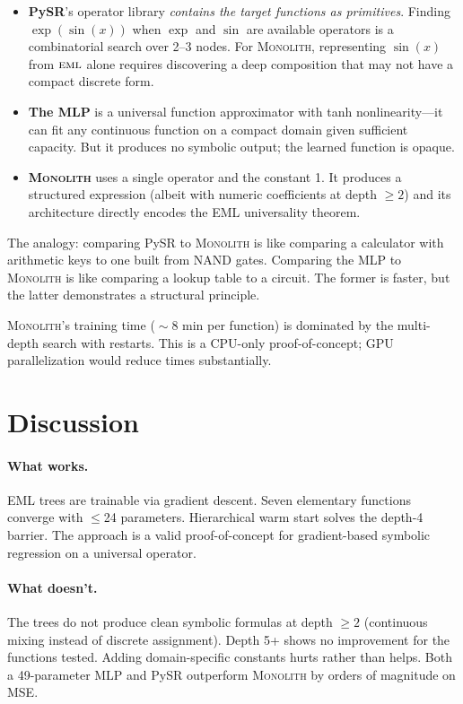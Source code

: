 \documentclass[11pt,a4paper]{article}
\newcommand{\eml}{\textsc{eml}}
\newcommand{\monolith}{\textsc{Monolith}}
\begin{document}
\begin{itemize}
    \item \textbf{PySR}'s operator library \emph{contains the target functions as primitives}. Finding $\exp(\sin(x))$ when $\exp$ and $\sin$ are available operators is a combinatorial search over 2--3 nodes. For \monolith{}, representing $\sin(x)$ from $\eml$ alone requires discovering a deep composition that may not have a compact discrete form.
    \item \textbf{The MLP} is a universal function approximator with tanh nonlinearity---it can fit any continuous function on a compact domain given sufficient capacity. But it produces no symbolic output; the learned function is opaque.
    \item \textbf{\monolith{}} uses a single operator and the constant 1. It produces a structured expression (albeit with numeric coefficients at depth $\geq 2$) and its architecture directly encodes the EML universality theorem.
\end{itemize}

The analogy: comparing PySR to \monolith{} is like comparing a calculator with arithmetic keys to one built from NAND gates. Comparing the MLP to \monolith{} is like comparing a lookup table to a circuit. The former is faster, but the latter demonstrates a structural principle.

\monolith{}'s training time (${}\sim$8 min per function) is dominated by the multi-depth search with restarts. This is a CPU-only proof-of-concept; GPU parallelization would reduce times substantially.

\section{Discussion}
\label{sec:discussion}

\paragraph{What works.}
EML trees are trainable via gradient descent.
Seven elementary functions converge with $\leq$24 parameters.
Hierarchical warm start solves the depth-4 barrier.
The approach is a valid proof-of-concept for gradient-based symbolic regression on a universal operator.

\paragraph{What doesn't.}
The trees do not produce clean symbolic formulas at depth $\geq 2$ (continuous mixing instead of discrete assignment).
Depth 5+ shows no improvement for the functions tested.
Adding domain-specific constants hurts rather than helps.
Both a 49-parameter MLP and PySR outperform \monolith{} by orders of magnitude on MSE.
\end{document}
